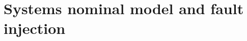 \documentclass[12pt,openright,twoside,a4paper,oldfontcommands,english,brazil,final]{abntex2}
\theoremstyle{theo}
\newcommand{\includegraphicsaspectratio}[2][1]{%
  \texttt{[image: \#2]}%
}
\newcommand{\parsin}[1]{\ensuremath\left( #1 \right)}
\begin{document}





\section{Systems nominal model and fault injection}
\label{sec:faults-injection}
\end{document}
